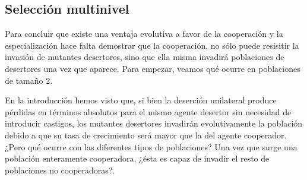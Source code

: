 \documentclass[a4paper,10pt]{article}
\begin{document}
{\subsection{Selección multinivel}

Para concluir que existe una ventaja evolutiva a favor de la cooperación y la especialización hace falta demostrar que la cooperación, no sólo puede resisitir la invasión de mutantes desertores, sino que ella misma invadirá poblaciones de desertores una vez que aparece.
Para empezar, veamos qué ocurre en poblaciones de tamaño 2.

% 

En la introducción hemos visto que, si bien la deserción unilateral produce pérdidas en términos absolutos para el mismo agente desertor sin necesidad de introducir castigos, los mutantes desertores invadirán evolutivamente la población debido a que su tasa de crecimiento será mayor que la del agente cooperador.
¿Pero qué ocurre con las diferentes tipos de poblaciones?
Una vez que surge una población enteramente cooperadora, ¿ésta es capaz de invadir el resto de poblaciones no cooperadoras?.


}
\end{document}
